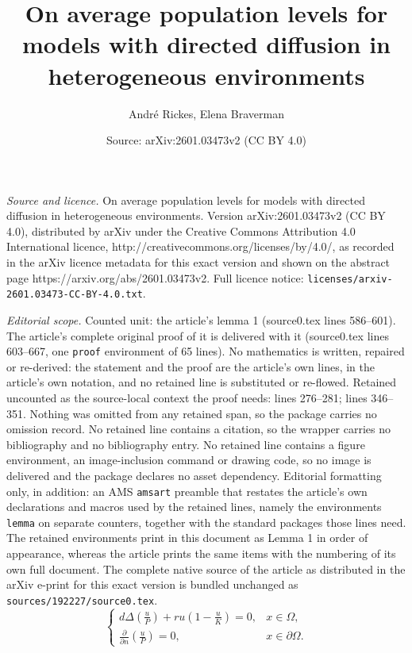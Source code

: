\documentclass[10pt,a4paper]{amsart}
\title{On average population levels for models with directed diffusion in heterogeneous environments}
\author{Andr\'e Rickes, Elena Braverman}
\date{Source: arXiv:2601.03473v2 (CC BY 4.0)}
\newcommand{\parentheses}[1]{\left(#1\right)}
\begin{document}
\maketitle

\noindent\emph{Source and licence.} On average population levels for models with directed diffusion in heterogeneous environments. Version arXiv:2601.03473v2 (CC BY 4.0), distributed by arXiv under the Creative Commons Attribution 4.0 International licence, http://creativecommons.org/licenses/by/4.0/, as recorded in the arXiv licence metadata for this exact version and shown on the abstract page https://arxiv.org/abs/2601.03473v2. Full licence notice: \texttt{licenses/arxiv-2601.03473-CC-BY-4.0.txt}.\par\smallskip

\noindent\textit{Editorial scope.} Counted unit: the article's lemma 1 (source0.tex lines 586--601). The article's complete original proof of it is delivered with it (source0.tex lines 603--667, one \texttt{proof} environment of 65 lines). No mathematics is written, repaired or re-derived: the statement and the proof are the article's own lines, in the article's own notation, and no retained line is substituted or re-flowed.  Retained uncounted as the source-local context the proof needs: lines 276--281; lines 346--351.  Nothing was omitted from any retained span, so the package carries no omission record.  No retained line contains a citation, so the wrapper carries no bibliography and no bibliography entry.  No retained line contains a figure environment, an image-inclusion command or drawing code, so no image is delivered and the package declares no asset dependency.  Editorial formatting only, in addition: an AMS \texttt{amsart} preamble that restates the article's own declarations and macros used by the retained lines, namely the environments \texttt{lemma} on separate counters, together with the standard packages those lines need.  The retained environments print in this document as Lemma 1 in order of appearance, whereas the article prints the same items with the numbering of its own full document.  The complete native source of the article as distributed in the arXiv e-print for this exact version is bundled unchanged as \texttt{sources/192227/source0.tex}.
\begin{equation}\label{intro2}
    \begin{cases}
  \displaystyle       d\Delta\parentheses{\frac{u}{P}}+ru\parentheses{1-\frac{u}{K}}=0, & x \in \Omega,  \\
  \displaystyle            \frac{\partial}{\partial n}\parentheses{\frac{u}{P}}=0,  & x \in \partial\Omega.
    \end{cases} 
\end{equation} 
\end{document}
